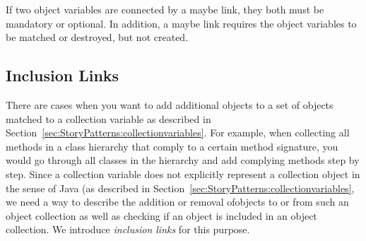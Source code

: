 If two object variables are connected by a maybe link, they both must be mandatory or optional. In addition, a maybe link requires the object variables to be matched or destroyed, but not created.  



\subsection{Inclusion Links}
\label{sec:StoryPatterns:inclusion}

There are cases when you want to add additional objects to a set of objects matched to a collection variable
as described in Section~\ref{sec:StoryPatterns:collectionvariables}.
For example, when collecting all methods in a class hierarchy that comply to a certain method signature,
you would go through all classes in the hierarchy and add complying methods step by step.
Since a collection variable does not explicitly represent a collection object in
the sense of Java (as described in Section~\ref{sec:StoryPatterns:collectionvariables},
we need a way to describe the addition or removal ofobjects to or from such an object collection
as well as checking if an object is included in an object collection.
We introduce \emph{inclusion links} for this purpose.

